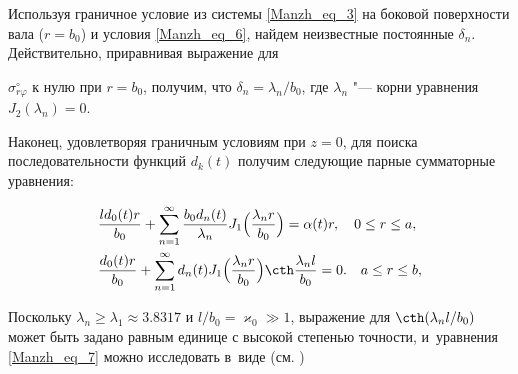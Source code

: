 Используя граничное условие из системы \eqref{Manzh_eq_3} на боковой поверхности вала ($r=b_0$) и условия \eqref{Manzh_eq_6}, найдем неизвестные постоянные $\delta_n$. Действительно, приравнивая выражение для

$\sigma_{r\varphi}^\circ$ к нулю при $r=b_0$, получим, что $\delta_n=\lambda_n/b_0$, где $\lambda_n$ "--- корни уравнения $J_2(\lambda_n)=0$.



Наконец, удовлетворяя граничным условиям при $z=0$, для поиска последовательности функций $d_k(t)$ получим следующие парные сумматорные уравнения: 

\begin{equation}\label{Manzh_eq_7}%

\begin{aligned}

  &

  \frac{ld_0(t)r}{b_0}

  +\sum_{n=1}^\infty\frac{b_0d_n(t)}{\lambda_n}J_1\Bigl(\frac{\lambda_nr}{b_0}\Bigr)=\alpha(t)r,

\quad    0\leq r\leq a,

\\

  &

  \frac{d_0(t)r}{b_0}

  +\sum_{n=1}^\infty d_n(t)J_1\Bigl(\frac{\lambda_nr}{b_0}\Bigr)\cth\frac{\lambda_nl}{b_0}=0.

\quad   a\leq r\leq b,

\end{aligned}

\end{equation}



Поскольку $\lambda_n\geq\lambda_1 \approx 3.8317$ и $l/b_0=\varkappa_0\gg1$, выражение для $\cth(\lambda_nl/b_0)$ может быть задано равным единице с высокой степенью точности, и~уравнения \eqref{Manzh_eq_7} можно исследовать в~виде (см. \cite{Manzh_bib_10})


